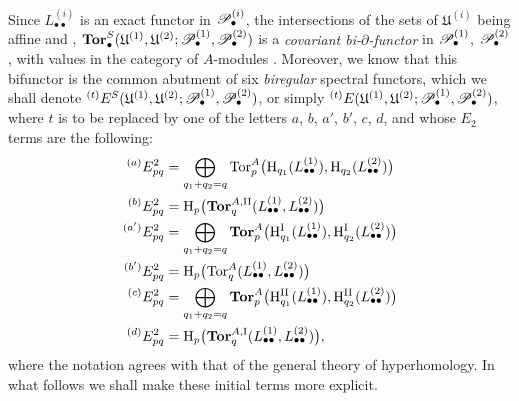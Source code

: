 \begin{env}[6.6.2]
Since $L_{\bullet\bullet}^{(i)}$ is an exact functor in
$\mathscr{P}_\bullet^{(i)}$, the intersections of the sets
of $\mathfrak U^{(i)}$ being affine
 and , $\mathbf{Tor}_\bullet^S
(\mathfrak U^{(1)},\mathfrak U^{(2)};
\mathscr{P}_\bullet^{(1)},\mathscr{P}_\bullet^{(2)})$
is a \emph{covariant bi-$\partial$-functor} in
$\mathscr{P}_\bullet^{(1)}$, $\mathscr{P}_\bullet^{(2)}$, with values in
the category of $A$-modules .  Moreover, we know
 that this bifunctor is the common abutment of six \emph{biregular}
spectral functors, which we shall denote ${}^{(t)}E^S
(\mathfrak U^{(1)},\mathfrak U^{(2)};
\mathscr{P}_\bullet^{(1)},\mathscr{P}_\bullet^{(2)})$,
or simply ${}^{(t)}E
(\mathfrak U^{(1)},\mathfrak U^{(2)};
\mathscr{P}_\bullet^{(1)},\mathscr{P}_\bullet^{(2)})$,
where $t$ is to be replaced by one of the letters $a$, $b$, $a'$, $b'$, $c$,
$d$, and whose $E_2$ terms are the following:
\[
\begin{aligned}
  {}^{(a)}E_{pq}^2
  &=
  \bigoplus_{q_1+q_2=q}
  \operatorname{Tor}_p^A
  \bigl(\mathrm H_{q_1}(L_{\bullet\bullet}^{(1)}),
        \mathrm H_{q_2}(L_{\bullet\bullet}^{(2)})\bigr)\\
  {}^{(b)}E_{pq}^2
  &=
  \mathrm H_p\bigl(
    \mathbf{Tor}_q^{A,\mathrm{II}}
    (L_{\bullet\bullet}^{(1)},L_{\bullet\bullet}^{(2)})
  \bigr)\\
  {}^{(a')}E_{pq}^2
  &=
  \bigoplus_{q_1+q_2=q}
  \mathbf{Tor}_p^A
  \bigl(\mathrm H_{q_1}^{\mathrm I}(L_{\bullet\bullet}^{(1)}),
        \mathrm H_{q_2}^{\mathrm I}(L_{\bullet\bullet}^{(2)})\bigr)\\
  {}^{(b')}E_{pq}^2
  &=
  \mathrm H_p\bigl(
    \operatorname{Tor}_q^A
    (L_{\bullet\bullet}^{(1)},L_{\bullet\bullet}^{(2)})
  \bigr)\\
  {}^{(c)}E_{pq}^2
  &=
  \bigoplus_{q_1+q_2=q}
  \mathbf{Tor}_p^A
  \bigl(\mathrm H_{q_1}^{\mathrm{II}}(L_{\bullet\bullet}^{(1)}),
        \mathrm H_{q_2}^{\mathrm{II}}(L_{\bullet\bullet}^{(2)})\bigr)\\
  {}^{(d)}E_{pq}^2
  &=
  \mathrm H_p\bigl(
    \mathbf{Tor}_q^{A,\mathrm I}
    (L_{\bullet\bullet}^{(1)},L_{\bullet\bullet}^{(2)})
  \bigr),
\end{aligned}
\]
where the notation agrees with that of the general theory of
hyperhomology.  In what follows we shall make these initial terms more explicit.
\end{env}

